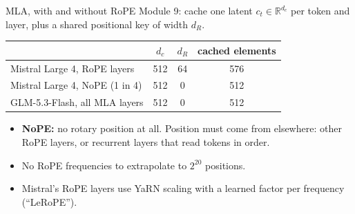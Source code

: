 \documentclass[handout]{beamer}
\begin{document}
\begin{frame}{MLA, with and without RoPE}
  \small
  Module 9: cache one latent $c_t\in\mathbb{R}^{d_c}$ per token and layer, plus a shared positional key of width $d_R$.
  \par\vspace{8pt}
  \centering
  \begin{tabular}{@{}lccc@{}}
    \toprule
    & $d_c$ & $d_R$ & cached elements \\
    \midrule
    Mistral Large 4, RoPE layers & 512 & 64 & 576 \\
    Mistral Large 4, NoPE (1 in 4) & 512 & 0 & 512 \\
    GLM-5.3-Flash, all MLA layers & 512 & 0 & 512 \\
    \bottomrule
  \end{tabular}
  \par\vspace{8pt}
  \raggedright
  \begin{itemize}
      \setlength{\itemsep}{4pt}
    \item \textbf{NoPE:} no rotary position at all. Position must come from elsewhere: other RoPE layers, or recurrent layers that read tokens in order.
    \item No RoPE frequencies to extrapolate to $2^{20}$ positions.
    \item Mistral's RoPE layers use YaRN scaling with a learned factor per frequency (``LeRoPE'').
  \end{itemize}
\end{frame}
\end{document}
